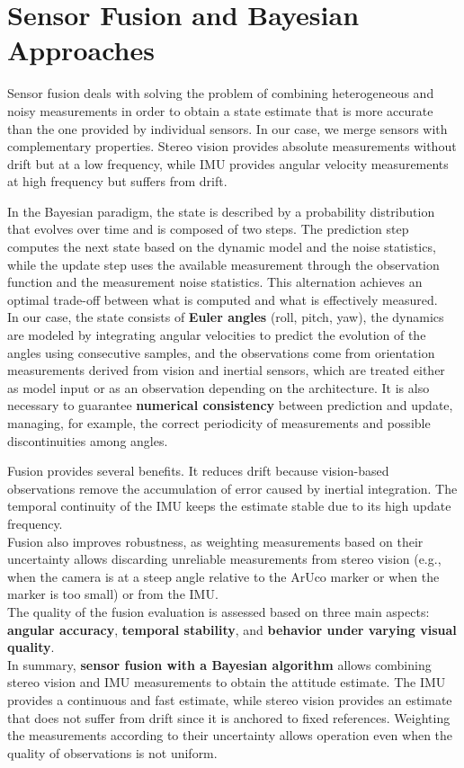 \section{Sensor Fusion and Bayesian Approaches}

Sensor fusion deals with solving the problem of combining heterogeneous and noisy measurements in order to obtain a state estimate that is more accurate than the one provided by individual sensors. In our case, we merge sensors with complementary properties. Stereo vision provides absolute measurements without drift but at a low frequency, while IMU provides angular velocity measurements at high frequency but suffers from drift.

In the Bayesian paradigm, the state is described by a probability distribution that evolves over time and is composed of two steps. The prediction step computes the next state based on the dynamic model and the noise statistics, while the update step uses the available measurement through the observation function and the measurement noise statistics. This alternation achieves an optimal trade-off between what is computed and what is effectively measured. 
\\In our case, the state consists of \textbf{Euler angles} (roll, pitch, yaw), the dynamics are modeled by integrating angular velocities to predict the evolution of the angles using consecutive samples, and the observations come from orientation measurements derived from vision and inertial sensors, which are treated either as model input or as an observation depending on the architecture. It is also necessary to guarantee \textbf{numerical consistency} between prediction and update, managing, for example, the correct periodicity of measurements and possible discontinuities among angles.

Fusion provides several benefits. It reduces drift because vision-based observations remove the accumulation of error caused by inertial integration. The temporal continuity of the IMU keeps the estimate stable due to its high update frequency. \\Fusion also improves robustness, as weighting measurements based on their uncertainty allows discarding unreliable measurements from stereo vision (e.g., when the camera is at a steep angle relative to the ArUco marker or when the marker is too small) or from the IMU.
\\The quality of the fusion evaluation is assessed based on three main aspects: \textbf{angular accuracy}, \textbf{temporal stability}, and \textbf{behavior under varying visual quality}.
\\In summary, \textbf{sensor fusion with a Bayesian algorithm} allows combining stereo vision and IMU measurements to obtain the attitude estimate. The IMU provides a continuous and fast estimate, while stereo vision provides an estimate that does not suffer from drift since it is anchored to fixed references.
Weighting the measurements according to their uncertainty allows operation even when the quality of observations is not uniform.


